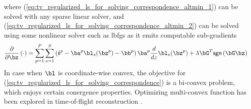 \documentclass[../writeup.tex]{subfiles}
\begin{document}
where (\ref{eq:tv_regularized_ls_for_solving_correspondence_altmin_1}) can be solved with any sparse linear solver, and (\ref{eq:tv_regularized_ls_for_solving_correspondence_altmin_2}) can be solved using some nonlinear solver such as lbfgs as it emits computable sub-gradients 
\begin{align}
    \frac{\partial}{\partial \bz} \left(\cdot\right)
        = \sum_{p=1}^P \sum_{s=1}^S 
            \left( \si^p - \ba^p \bl_s(\bz^p) - \bb^p \right) \ba^p \frac{d}{dz} \bl_s(\bz^p)
            + \lambda \bG^T \textsf{sgn}\left( \bG \bz \right)
    \label{eq:tv_regularized_ls_for_solving_correspondence_altmin_1_gradient}
\end{align}
In case when $\bl$ is coordinate-wise convex, the objective for (\ref{eq:tv_regularized_ls_for_solving_correspondence}) is a bi-convex problem, which enjoys certain conergence properties. Optimizing multi-convex function has been explored in time-of-flight reconstruction \cite{heideNonlineofsightImagingPartial2017}.
 




\end{document}
